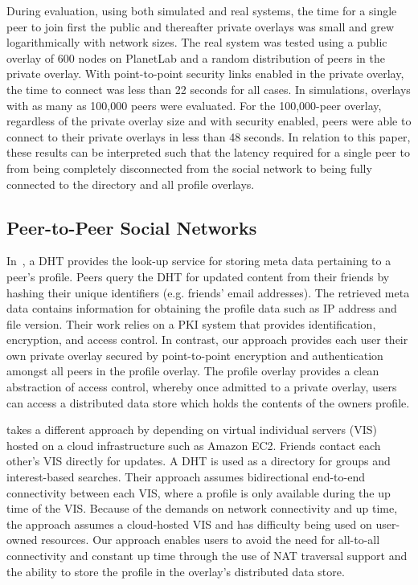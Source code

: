 \documentclass[conference]{IEEEtran}
\begin{document}
During evaluation, using both simulated and real systems, the time for a
single peer to join first the public and thereafter private overlays was small
and grew logarithmically with network sizes.  The real system was tested using
a public overlay of 600 nodes on PlanetLab and a random distribution of peers
in the private overlay.  With point-to-point security links enabled in the
private overlay, the time to connect was less than 22 seconds for all cases.
In simulations, overlays with as many as 100,000 peers were evaluated.  For
the 100,000-peer overlay, regardless of the private overlay size and with
security enabled, peers were able to connect to their private overlays in less
than 48 seconds.  In relation to this paper, these results can be interpreted
such that the latency required for a single peer to from being completely
disconnected from the social network to being fully connected to the directory
and all profile overlays.

\subsection{Peer-to-Peer Social Networks}

In~\cite{peerson}, a DHT provides the look-up service for storing meta data
pertaining to a peer's profile.  Peers query the DHT for updated content from
their friends by hashing their unique identifiers (e.g. friends' email
addresses).  The retrieved meta data contains information for obtaining the
profile data such as IP address and file version. Their work relies on a PKI
system that provides identification, encryption, and access control.  In
contrast, our approach provides each user their own private overlay secured by
point-to-point encryption and authentication amongst all peers in the profile
overlay.  The profile overlay provides a clean abstraction of access control,
whereby once admitted to a private overlay, users can access a distributed
data store which holds the contents of the owners profile.

\cite{vis-a-vis} takes a different approach by depending on virtual individual
servers (VIS) hosted on a cloud infrastructure such as Amazon EC2. Friends
contact each other's VIS directly for updates.  A DHT is used as a directory
for groups and interest-based searches. Their approach assumes bidirectional
end-to-end connectivity between each VIS, where a profile is only available
during the up time of the VIS.  Because of the demands on network connectivity
and up time, the approach assumes a cloud-hosted VIS and has difficulty being
used on user-owned resources.  Our approach enables users to avoid the need
for all-to-all connectivity and constant up time through the use of NAT
traversal support and the ability to store the profile in the overlay's
distributed data store.
\end{document}
